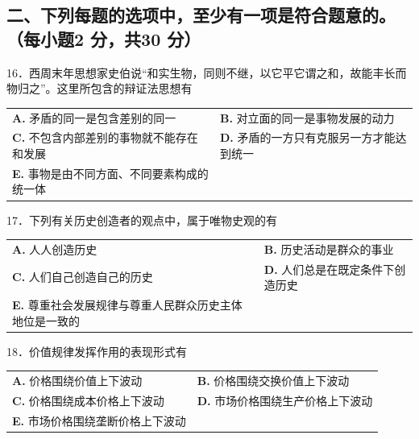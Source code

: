 \documentclass[UTF8,11pt]{ctexart}
\begin{document}
\subsection*{二、下列每题的选项中，至少有一项是符合题意的。（每小题2 分，共30 分）}

16．西周末年思想家史伯说“和实生物，同则不继，以它平它谓之和，故能丰长而物归之”。这里所包含的辩证法思想有


\begin{center}\begin{tabular}{>{\raggedright\arraybackslash}p{\dimexpr(\linewidth-4\tabcolsep)/2\relax}>{\raggedright\arraybackslash}p{\dimexpr(\linewidth-4\tabcolsep)/2\relax}}
\textbf{A.} 矛盾的同一是包含差别的同一 & \textbf{B.} 对立面的同一是事物发展的动力\\[.35em]
\textbf{C.} 不包含内部差别的事物就不能存在和发展 & \textbf{D.} 矛盾的一方只有克服另一方才能达到统一\\[.35em]
\textbf{E.} 事物是由不同方面、不同要素构成的统一体 & \\[.35em]\end{tabular}\end{center}

17．下列有关历史创造者的观点中，属于唯物史观的有


\begin{center}\begin{tabular}{>{\raggedright\arraybackslash}p{\dimexpr(\linewidth-4\tabcolsep)/2\relax}>{\raggedright\arraybackslash}p{\dimexpr(\linewidth-4\tabcolsep)/2\relax}}
\textbf{A.} 人人创造历史 & \textbf{B.} 历史活动是群众的事业\\[.35em]
\textbf{C.} 人们自己创造自己的历史 & \textbf{D.} 人们总是在既定条件下创造历史\\[.35em]
\textbf{E.} 尊重社会发展规律与尊重人民群众历史主体地位是一致的 & \\[.35em]\end{tabular}\end{center}

18．价值规律发挥作用的表现形式有


\begin{center}\begin{tabular}{>{\raggedright\arraybackslash}p{\dimexpr(\linewidth-4\tabcolsep)/2\relax}>{\raggedright\arraybackslash}p{\dimexpr(\linewidth-4\tabcolsep)/2\relax}}
\textbf{A.} 价格围绕价值上下波动 & \textbf{B.} 价格围绕交换价值上下波动\\[.35em]
\textbf{C.} 价格围绕成本价格上下波动 & \textbf{D.} 市场价格围绕生产价格上下波动\\[.35em]
\textbf{E.} 市场价格围绕垄断价格上下波动 & \\[.35em]\end{tabular}\end{center}
\end{document}
